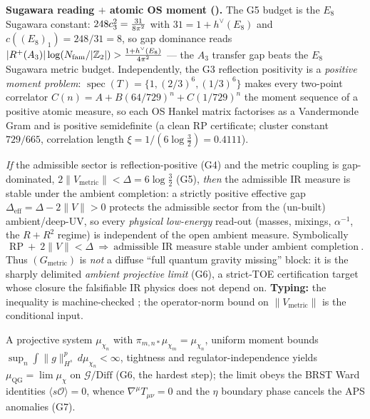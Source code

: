 \par\smallskip\noindent\textbf{Sugawara reading $+$ atomic OS moment ().}
The G5 budget is the $E_8$ Sugawara constant: $248c_3^2=\tfrac{31}{8\pi^2}$ with $31=1+h^\vee(E_8)$ and
$c((E_8)_1)=248/31=8$, so gap dominance reads
$|R^+(A_3)|\log(N_{\mathrm{fam}}/|\mathbb Z_2|)>\tfrac{1+h^\vee(E_8)}{4\pi^2}$ --- the $A_3$ transfer gap beats the $E_8$
Sugawara metric budget. Independently, the G3 reflection positivity is a \emph{positive moment problem}:
$\operatorname{spec}(T)=\{1,(2/3)^6,(1/3)^6\}$ makes every two-point correlator
$C(n)=A+B(64/729)^n+C(1/729)^n$ the moment sequence of a positive atomic measure, so each OS Hankel matrix
factorises as a Vandermonde Gram and is positive semidefinite (a clean RP certificate; cluster constant
$729/665$, correlation length $\xi=1/(6\log\tfrac32)=0.4111$).

\begin{theorem}
\emph{If} the admissible sector is reflection-positive (G4) and the metric coupling is gap-dominated,
$2\|V_{\mathrm{metric}}\|<\Delta=6\log\tfrac32$ (G5), \emph{then} the admissible IR measure is stable under
the ambient completion: a strictly positive effective gap $\Delta_{\mathrm{eff}}=\Delta-2\|V\|>0$ protects the
admissible sector from the (un-built) ambient/deep-UV, so every \emph{physical low-energy} read-out (masses,
mixings, $\alpha^{-1}$, the $R{+}R^2$ regime) is independent of the open ambient measure. Symbolically
\[
  \boxed{\ \mathrm{RP}\ +\ 2\|V\|<\Delta\ \Longrightarrow\ \text{admissible IR measure stable under ambient completion}\ .}
\]
Thus $(G_{\mathrm{metric}})$ is \emph{not} a diffuse ``full quantum gravity missing'' block: it is the sharply
delimited \emph{ambient projective limit} (G6), a strict-TOE certification target whose closure the
falsifiable IR physics does not depend on. \textbf{Typing:} the inequality is machine-checked \mE; the
operator-norm bound on $\|V_{\mathrm{metric}}\|$ is the conditional input.
\end{theorem}

\begin{lemma}
A projective system $\mu_{\chi_n}$ with $\pi_{m,n*}\mu_{\chi_m}=\mu_{\chi_n}$, uniform moment bounds
$\sup_n\!\int\|g\|_{H^s}^p\,d\mu_{\chi_n}<\infty$, tightness and regulator-independence yields
$\mu_{\mathrm{QG}}=\lim\mu_\chi$ on $\mathcal G/\mathrm{Diff}$ (G6, the hardest step); the limit obeys the
BRST Ward identities $\langle s\mathcal O\rangle=0$, whence $\nabla^\mu T_{\mu\nu}=0$ and the $\eta$
boundary phase cancels the APS anomalies (G7).
\end{lemma}

